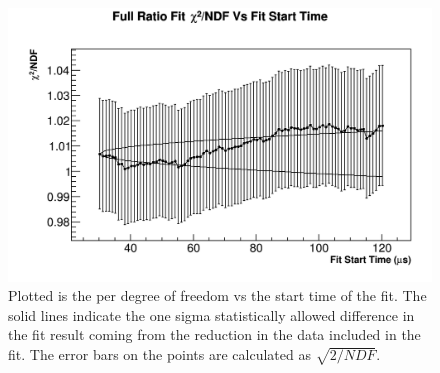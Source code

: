	\begin{figure}[h]
		\centering
		\includegraphics[width=\textwidth]{RatioCBO_Chi2NDF_Vs_FS_canv}
	    \caption[Chi2FSScan]{Plotted is the \chisq per degree of freedom vs the start time of the fit. The solid lines indicate the one sigma statistically allowed difference in the fit result coming from the reduction in the data included in the fit. The error bars on the points are calculated as $\sqrt{2/NDF}$.}
	    \label{fig:Chi2FSScan}
	\end{figure}


